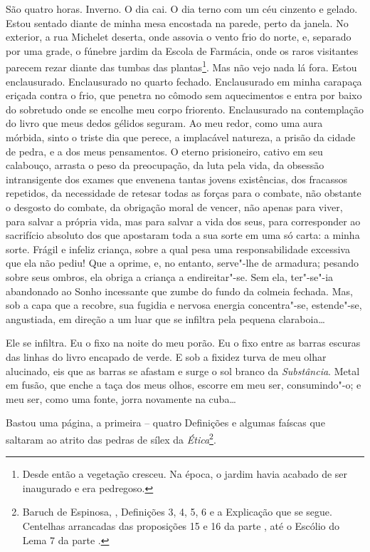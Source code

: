São quatro horas. Inverno. O dia cai. O dia terno com um céu cinzento e
gelado. Estou sentado diante de minha mesa encostada na parede, perto da
janela. No exterior, a rua Michelet deserta, onde assovia o vento frio
do norte, e, separado por uma grade, o fúnebre jardim da Escola de
Farmácia, onde os raros visitantes parecem rezar diante das tumbas das
plantas\footnote{Desde então a vegetação cresceu. Na época, o jardim
  havia acabado de ser inaugurado e era pedregoso.}. Mas não vejo nada
lá fora. Estou enclausurado. Enclausurado no quarto fechado.
Enclausurado em minha carapaça eriçada contra o frio, que penetra no
cômodo sem aquecimentos e entra por baixo do sobretudo onde se encolhe
meu corpo friorento. Enclausurado na contemplação do livro que meus
dedos gélidos seguram. Ao meu redor, como uma aura mórbida, sinto o
triste dia que perece, a implacável natureza, a prisão da cidade de
pedra, e a dos meus pensamentos. O eterno prisioneiro, cativo em seu
calabouço, arrasta o peso da preocupação, da luta pela vida, da obsessão
intransigente dos exames que envenena tantas jovens existências, dos
fracassos repetidos, da necessidade de retesar todas as forças para o
combate, não obstante o desgosto do combate, da obrigação moral de
vencer, não apenas para viver, para salvar a própria vida, mas para
salvar a vida dos seus, para corresponder ao sacrifício absoluto dos que
apostaram toda a sua sorte em uma só carta: a minha sorte. Frágil e
infeliz criança, sobre a qual pesa uma responsabilidade excessiva que
ela não pediu! Que a oprime, e, no entanto, serve"-lhe de armadura;
pesando sobre seus ombros, ela obriga a criança a endireitar"-se. Sem
ela, ter"-se"-ia abandonado ao Sonho incessante que zumbe do fundo da
colmeia fechada. Mas, sob a capa que a recobre, sua fugidia e nervosa
energia concentra"-se, estende"-se, angustiada, em direção a um luar que
se infiltra pela pequena claraboia\ldots{}

Ele se infiltra. Eu o fixo na noite do meu porão. Eu o fixo entre as
barras escuras das linhas do livro encapado de verde. E sob a fixidez
turva de meu olhar alucinado, eis que as barras se afastam e surge o sol
branco da \emph{Substância}. Metal em fusão, que enche a taça dos meus
olhos, escorre em meu ser, consumindo"-o; e meu ser, como uma fonte,
jorra novamente na cuba\ldots{}

Bastou uma página, a primeira -- quatro Definições e algumas faíscas que
saltaram ao atrito das pedras de sílex da \emph{Ética}\footnote{Baruch
  de Espinosa, {} \scalebox{0.8}{I}, Definições 3, 4, 5, 6 e a Explicação que
  se segue. Centelhas arrancadas das proposições 15 e 16 da parte \scalebox{0.8}{I}, até
  o Escólio do Lema 7 da parte \scalebox{0.8}{II}.}.

